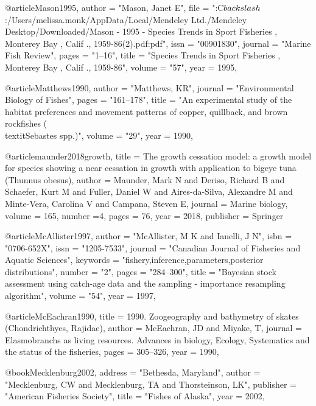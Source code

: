 @article{Mason1995,
    author = "{Mason, Janet E}",
    file = "{:C$\\backslash$:/Users/melissa.monk/AppData/Local/Mendeley Ltd./Mendeley Desktop/Downloaded/Mason - 1995 - Species Trends in Sport Fisheries , Monterey Bay , Calif ., 1959-86(2).pdf:pdf}",
    issn = "{00901830}",
    journal = "{Marine Fish Review}",
    pages = "{1--16}",
    title = "{{Species Trends in Sport Fisheries , Monterey Bay , Calif ., 1959-86}}",
    volume = "{57}",
    year = 1995,
}

@article{Matthews1990,
    author = "{Matthews, KR}",
    journal = "{Environmental Biology of Fishes}",
    pages = "{161--178}",
    title = "{{An experimental study of the habitat preferences and movement patterns of copper, quillback, and brown rockfishes (\\textit{{Sebastes}} spp.)}}",
    volume = "{29}",
    year = 1990,
}

@article{maunder2018growth,
  title = {The growth cessation model: a growth model for species showing a near cessation in growth with application to bigeye tuna (Thunnus obesus)},
  author = {Maunder, Mark N and Deriso, Richard B and Schaefer, Kurt M and Fuller, Daniel W and Aires-da-Silva, Alexandre M and Minte-Vera, Carolina V and Campana, Steven E},
  journal = {Marine biology},
  volume = {165},
  number ={4},
  pages = {76},
  year = 2018,
  publisher = {Springer}
}

@article{McAllister1997,
    author = "{McAllister, M K and Ianelli, J N}",
    isbn = "{0706-652X}",
    issn = "{1205-7533}",
    journal = "{Canadian Journal of Fisheries and Aquatic Sciences}",
    keywords = "{fishery,inference,parameters,posterior distributions}",
    number = "{2}",
    pages = "{284--300}",
    title = "{{Bayesian stock assessment using catch-age data and the sampling - importance resampling algorithm}}",
    volume = "{54}",
    year = 1997,
}

@article{McEachran1990,
  title = {1990. Zoogeography and bathymetry of skates (Chondrichthyes, Rajidae)},
  author = {McEachran, JD and Miyake, T},
  journal = {Elasmobranchs as living resources. Advances in biology, Ecology, Systematics and the status of the fisheries},
  pages = {305--326},
  year = 1990,
}

@book{Mecklenburg2002,
    address = "{Bethesda, Maryland}",
    author = "{Mecklenburg, CW and Mecklenburg, TA and Thorsteinson, LK}",
    publisher = "{American Fisheries Society}",
    title = "{{Fishes of Alaska}}",
    year = 2002,
}

